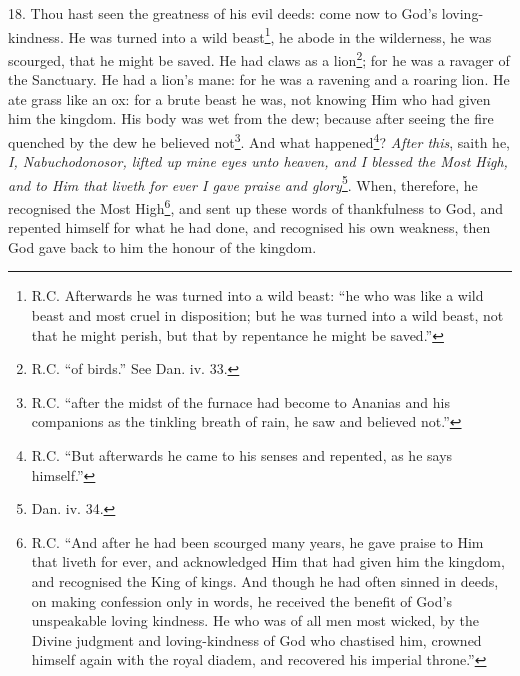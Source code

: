 18. Thou hast seen the greatness of his evil deeds: come now to God’s loving-kindness. He was turned into a wild beast\footnote{R.C. Afterwards he was turned into a wild beast: “he who was like a wild beast and most cruel in disposition; but he was turned into a wild beast, not that he might perish, but that by repentance he might be saved.”}, he abode in the wilderness, he was scourged, that he might be saved. He had claws as a lion\footnote{R.C. “of birds.” See Dan. iv. 33.}; for he was a ravager of the Sanctuary. He had a lion’s mane: for he was a ravening and a roaring lion. He ate grass like an ox: for a brute beast he was, not knowing Him who had given him the kingdom. His body was wet from the dew; because after seeing the fire quenched by the dew he believed not\footnote{R.C. “after the midst of the furnace had become to Ananias and his companions as the tinkling breath of rain, he saw and believed not.”}. And what happened\footnote{R.C. “But afterwards he came to his senses and repented, as he says himself.”}? \emph{After this}, saith he, \emph{I, Nabuchodonosor, lifted up} \emph{mine eyes unto heaven, and I blessed the Most High, and to Him that liveth for ever I gave praise and glory}\footnote{Dan. iv. 34.}. When, therefore, he recognised the Most High\footnote{R.C. “And after he had been scourged many years, he gave praise to Him that liveth for ever, and acknowledged Him that had given him the kingdom, and recognised the King of kings. And though he had often sinned in deeds, on making confession only in words, he received the benefit of God’s unspeakable loving kindness. He who was of all men most wicked, by the Divine judgment and loving-kindness of God who chastised him, crowned himself again with the royal diadem, and recovered his imperial throne.”}, and sent up these words of thankfulness to God, and repented himself for what he had done, and recognised his own weakness, then God gave back to him the honour of the kingdom.

